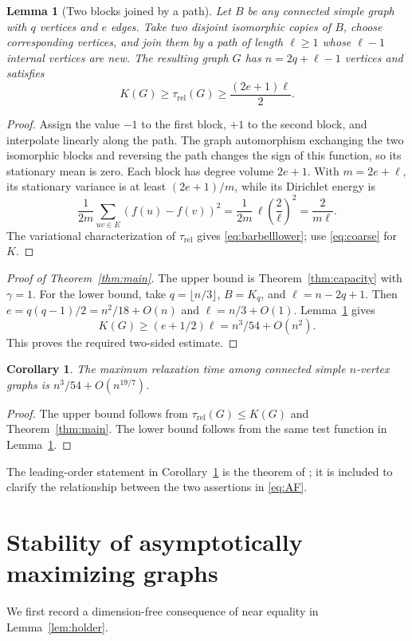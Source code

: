 \documentclass[11pt]{amsart}
\numberwithin{equation}{section}
\newtheorem{lemma}[theorem]{Lemma}
\newtheorem{corollary}[theorem]{Corollary}
\theoremstyle{definition}
\theoremstyle{remark}
\newcommand{\trel}{\tau_{\mathrm{rel}}}
\begin{document}
\begin{lemma}[Two blocks joined by a path]\label{lem:barbelllower}
Let $B$ be any connected simple graph with $q$ vertices and $e$ edges. Take two disjoint isomorphic copies of $B$, choose corresponding vertices, and join them by a path of length $\ell\ge1$ whose $\ell-1$ internal vertices are new. The resulting graph $G$ has $n=2q+\ell-1$ vertices and satisfies
\begin{equation}\label{eq:barbelllower}
K(G)\ge\trel(G)\ge\frac{(2e+1)\ell}{2}.
\end{equation}
\end{lemma}
\begin{proof}
Assign the value $-1$ to the first block, $+1$ to the second block, and interpolate linearly along the path. The graph automorphism exchanging the two isomorphic blocks and reversing the path changes the sign of this function, so its stationary mean is zero. Each block has degree volume $2e+1$. With $m=2e+\ell$, its stationary variance is at least $(2e+1)/m$, while its Dirichlet energy is
\[
\frac1{2m}\sum_{uv\in E}(f(u)-f(v))^2
=\frac1{2m}\,\ell\left(\frac2\ell\right)^2
=\frac2{m\ell}.
\]
The variational characterization of $\trel$ gives \eqref{eq:barbelllower}; use \eqref{eq:coarse} for $K$.
\end{proof}

\begin{proof}[Proof of Theorem~\ref{thm:main}]
The upper bound is Theorem~\ref{thm:capacity} with $\gamma=1$. For the lower bound, take $q=\lfloor n/3\rfloor$, $B=K_q$, and $\ell=n-2q+1$. Then $e=q(q-1)/2=n^2/18+O(n)$ and $\ell=n/3+O(1)$. Lemma~\ref{lem:barbelllower} gives
\[
K(G)\ge(e+1/2)\ell=n^3/54+O(n^2).
\]
This proves the required two-sided estimate.
\end{proof}

\begin{corollary}\label{cor:relaxation}
The maximum relaxation time among connected simple $n$-vertex graphs is $n^3/54+O(n^{19/7})$.
\end{corollary}
\begin{proof}
The upper bound follows from $\trel(G)\le K(G)$ and Theorem~\ref{thm:main}. The lower bound follows from the same test function in Lemma~\ref{lem:barbelllower}.
\end{proof}
The leading-order statement in Corollary~\ref{cor:relaxation} is the theorem of \cite{ACTT}; it is included to clarify the relationship between the two assertions in \eqref{eq:AF}.

\section{Stability of asymptotically maximizing graphs}\label{sec:stability}
We first record a dimension-free consequence of near equality in Lemma~\ref{lem:holder}.
\end{document}
